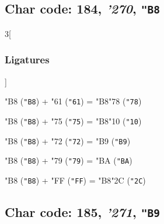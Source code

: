 \documentclass{article}
\newlength{\maxcharwidth}
\begin{document}
\subsection{Char code: 184, {\it'270}, {\tt"B8}}
\label{char_184}


\begin{multicols}{3}[\subsubsection{Ligatures}]

{\testfont\char"B8\noboundary} ({\tt"B8}) + {\testfont\char"61\noboundary} ({\tt"61}) = {\testfont\char"B8\noboundary}{\testfont\char"78\noboundary} ({\tt"78}) 

{\testfont\char"B8\noboundary} ({\tt"B8}) + {\testfont\char"75\noboundary} ({\tt"75}) = {\testfont\char"B8\noboundary}{\testfont\char"10\noboundary} ({\tt"10}) 

{\testfont\char"B8\noboundary} ({\tt"B8}) + {\testfont\char"72\noboundary} ({\tt"72}) = {\testfont\char"B9\noboundary} ({\tt"B9}) 

{\testfont\char"B8\noboundary} ({\tt"B8}) + {\testfont\char"79\noboundary} ({\tt"79}) = {\testfont\char"BA\noboundary} ({\tt"BA}) 

{\testfont\char"B8\noboundary} ({\tt"B8}) + {\testfont\char"FF\noboundary} ({\tt"FF}) = {\testfont\char"B8\noboundary}{\testfont\char"2C\noboundary} ({\tt"2C}) 

\end{multicols}

\subsection{Char code: 185, {\it'271}, {\tt"B9}}
\label{char_185}

\end{document}
